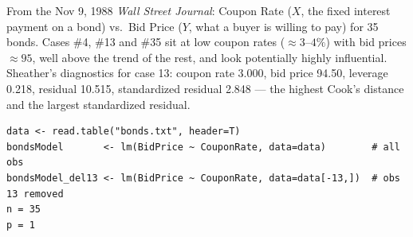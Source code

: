 \begin{example}
    From the Nov 9, 1988 \emph{Wall Street Journal}: Coupon Rate ($X$, the fixed interest
    payment on a bond) vs.\ Bid Price ($Y$, what a buyer is willing to pay) for 35 bonds. Cases
    \#4, \#13 and \#35 sit at low coupon rates ($\approx3$--$4\%$) with bid prices $\approx95$, well
    above the trend of the rest, and look potentially highly influential. Sheather's diagnostics
    for case 13: coupon rate 3.000, bid price 94.50, leverage 0.218, residual 10.515,
    standardized residual 2.848 --- the highest Cook's distance and the largest standardized
    residual. 
\begin{verbatim}
data <- read.table("bonds.txt", header=T)
bondsModel       <- lm(BidPrice ~ CouponRate, data=data)        # all obs
bondsModel_del13 <- lm(BidPrice ~ CouponRate, data=data[-13,])  # obs 13 removed
n = 35
p = 1
\end{verbatim}
\end{example}

